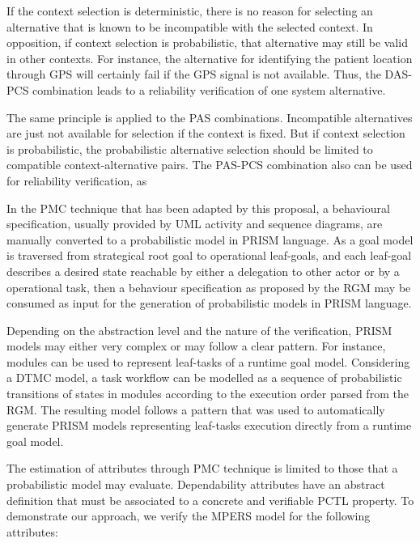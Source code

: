 If the context selection is deterministic, there is no reason for selecting an alternative that is known to be incompatible with the selected context. In opposition, if context selection is probabilistic, that alternative may still be valid in other contexts. For instance, the alternative for identifying the patient location through GPS will certainly fail if the GPS signal is not available. Thus, the DAS-PCS combination leads to a reliability verification of one system alternative.

The same principle is applied to the PAS combinations. Incompatible alternatives are just not available for selection if the context is fixed. But if context selection is probabilistic, the probabilistic alternative selection should be limited to compatible context-alternative pairs. The PAS-PCS combination also can be used for reliability verification, as 







In the PMC technique that has been adapted by this proposal, a behavioural specification, usually provided by UML activity and sequence diagrams, are manually converted to a probabilistic model in PRISM language. As a goal model is traversed from strategical root goal to operational leaf-goals, and each leaf-goal describes a desired state reachable by either a delegation to other actor or by a operational task, then a behaviour specification as proposed by the RGM may be consumed as input for the generation of probabilistic models in PRISM language.

Depending on the abstraction level and the nature of the verification, PRISM models may either very complex or may follow a clear pattern. For instance, modules can be used to represent leaf-tasks of a runtime goal model. Considering a DTMC model, a task workflow can be modelled as a sequence of probabilistic transitions of states in modules according to the execution order parsed from the RGM. The resulting model follows a pattern that was used to automatically generate PRISM models representing leaf-tasks execution directly from a runtime goal model.

The estimation of attributes through PMC technique is limited to those that a probabilistic model may evaluate. Dependability attributes have an abstract definition that must be associated to a concrete and verifiable PCTL property. To demonstrate our approach, we verify the MPERS model for the following attributes:

